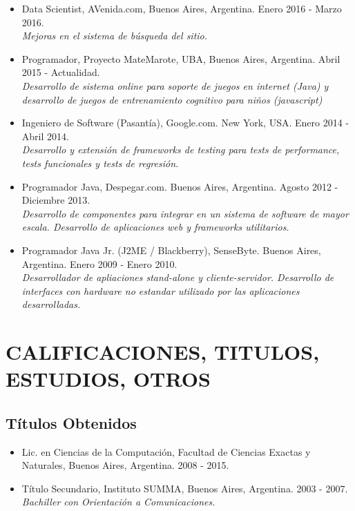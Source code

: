 \documentclass[a4paper,10pt]{article}
\begin{document}
\begin{itemize}
    \item {Data Scientist, AVenida.com, Buenos Aires, Argentina.
            Enero 2016 - Marzo 2016. \\
            {\small \itshape Mejoras en el sistema de búsqueda del sitio.}}

    \item {Programador, Proyecto MateMarote, UBA, Buenos Aires, Argentina.
            Abril 2015 - Actualidad. \\
            {\small \itshape Desarrollo de sistema online para soporte de
        juegos en internet (Java) y desarrollo de juegos de entrenamiento
cognitivo para niños (javascript)}}

    \item {Ingeniero de Software (Pasantía), Google.com. New York, USA. Enero
            2014 - Abril 2014. \\ 
    {\small \itshape Desarrollo y extensión de frameworks de testing para tests
de performance, tests funcionales y tests de regresión.}}

    \item {Programador Java, Despegar.com. Buenos Aires, Argentina. Agosto 2012
           - Diciembre 2013. \\
    {\small \itshape Desarrollo de componentes para integrar en un sistema de
software de mayor escala. Desarrollo de aplicaciones web y frameworks
utilitarios.}}

    \item {Programador Java Jr. (J2ME / Blackberry), SenseByte. Buenos Aires,
            Argentina. Enero 2009 - Enero 2010. \\ 
    {\small \itshape Desarrollador de apliaciones stand-alone y
cliente-servidor.  Desarrollo de interfaces con hardware no estandar utilizado
por las aplicaciones desarrolladas.}}

\end{itemize}

\section{CALIFICACIONES, TITULOS, ESTUDIOS, OTROS}

\subsection{Títulos Obtenidos}

\begin{itemize}
    \item {Lic. en Ciencias de la Computación, Facultad de Ciencias Exactas y
        Naturales, Buenos Aires, Argentina. 2008 - 2015.}
    \item {Título Secundario, Instituto SUMMA, Buenos Aires, Argentina. 2003
            - 2007. \\
        {\small \itshape Bachiller con Orientación a Comunicaciones.}}
\end{itemize}
\end{document}
